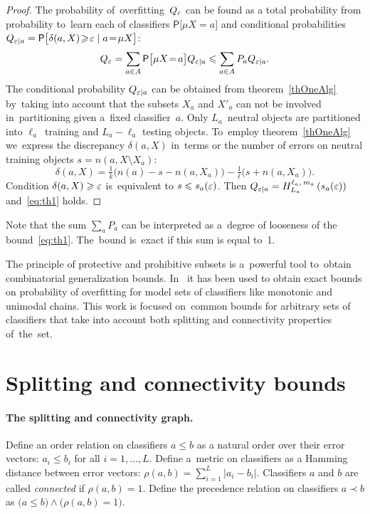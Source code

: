 \documentclass{article}
\let\cite\citep
\def\AA{A}
\renewcommand{\geq}{\geqslant}
\renewcommand{\leq}{\leqslant}
\providecommand{\Prob}{\mathsf{P}}
\def\Prbig[#1]{\Prob\bigl[#1\bigr]}
\newcommand{\hypergeom}[5]{{#1}_{#2}^{#4,\:#3}\left(#5\right)}
\newcommand{\Hyper}[4]{\hypergeom{H}{#1}{#2}{#3}{#4}}
\renewcommand{\emph}[1]{\textit{#1}}
\begin{document}
\begin{proof}
    The probability of~overfitting~$Q_\varepsilon$
    can be found as a total probability
    from probability to~learn each of classifiers $\Prbig[ \mu X\!=\!a ]$
    and conditional probabilities
    ${
        Q_{\eps|a} = \Prbig[ \delta(a,X) \!\geq\! \eps \mid a\!=\!\mu X ]
    }$:
    \[
        Q_\eps
        =
        \sum_{a\in \AA}
            \Prbig[ \mu X\!=\!a ] Q_{\eps|a}
        \leq
        \sum_{a\in \AA}
            P_a Q_{\eps|a}.
    \]
    The conditional probability $Q_{\varepsilon|a}$ can be obtained from theorem~\ref{thOneAlg}
    by~taking into account that
    the subsets $X_a$ and $X'_a$ can not be involved in~partitioning given a~fixed classifier~$a$.
    Only $L_a$~neutral objects are partitioned
    into $\ell_a$~training and $L_a-\ell_a$ testing objects.
    To~employ theorem~\ref{thOneAlg} we~express the discrepancy $\delta(a,X)$
    in~terms or the number of errors on neutral training objects $s = n(a,X{\setminus} X_a)$:
    \[
        \delta(a,X) =
        \tfrac1k \bigl( n(a)-s-n(a,X_a) \bigr) -
        \tfrac1\ell \bigl( s+n(a,X_a) \bigr).
    \]
    Condition $\delta(a,X)\geq \eps$ is~equivalent to $s\leq s_a(\eps)$.
    Then $Q_{\eps|a} = \Hyper{L_a}{m_a}{\ell_a}{ s_a(\eps) }$
    and~\eqref{eq:th1} holds.
\end{proof}

Note that the sum $\sum_a P_a$ can be interpreted
as a~degree of looseness of the bound~\eqref{eq:th1}.
The~bound is~exact if this sum is equal to~1.

\medskip
The principle of protective and prohibitive subsets
is a~powerful tool to~obtain combinatorial generalization bounds.
In~\cite{voron10pria-eng} it has been used to obtain exact bounds on probability of overfitting
for model sets of classifiers like monotonic and unimodal chains.
This work is focused on~common bounds for arbitrary sets of classifiers
that take into account both splitting and connectivity properties of~the~set.

\section{Splitting and connectivity bounds}
\label{sec:SC-bound}

\paragraph{The splitting and connectivity graph.}
Define an order relation on classifiers $a\leq b$ as a natural order over their error vectors:
$a_i \leq b_i$ for all $i=1,\ldots,L$.
Define a~metric on classifiers as a Hamming distance between error vectors:
$\rho(a,b) = \sum_{i=1}^L |a_i-b_i|$.
Classifiers $a$ and $b$ are called \emph{connected} if $\rho(a,b) = 1$.
Define the precedence relation on classifiers $a\prec b$ as
$\bigl(a\leq b\bigr) \wedge \bigl( \rho(a,b)=1 \bigr)$.
\end{document}
